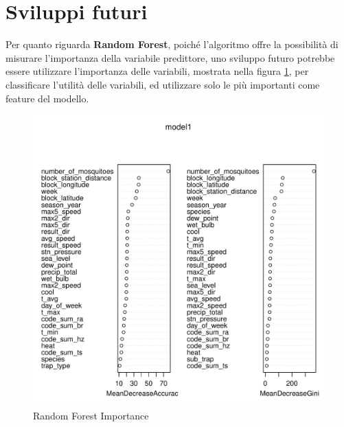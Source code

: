 \section{Sviluppi futuri}

Per quanto riguarda \textbf{Random Forest}, poiché l'algoritmo offre la 
possibilità di misurare l’importanza della variabile predittore, uno sviluppo 
futuro potrebbe essere utilizzare l'importanza delle variabili, mostrata nella 
figura \ref{fig:rf_importance}, per classificare l'utilità delle variabili, ed 
utilizzare solo le più importanti come feature del modello. 

\begin{figure}[H]
	\centering
	\includegraphics[width=0.6\columnwidth]{images/ml/random_forest/HoldoutRF/model_importance}
	\caption{Random Forest Importance}
	\label{fig:rf_importance}
\end{figure}

